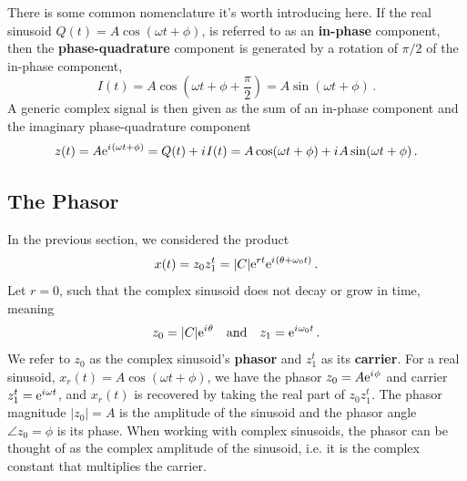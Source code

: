 There is some common nomenclature it's worth introducing here. If the real
sinusoid $Q(t) = A\cos(\omega t + \phi)$, is referred to as an \textbf{in-phase}
component, then the \textbf{phase-quadrature} component is generated by
a rotation of $\pi/2$ of the in-phase component,
%
\begin{displaymath}
  I(t) = A\cos\left(\omega t + \phi + \frac{\pi}{2}\right) = A\sin(\omega t + \phi) \,.
\end{displaymath}
%
A generic complex signal is then given as the sum of an in-phase component
and the imaginary phase-quadrature component
%
\begin{displaymath}
  z(t) = A\mathrm{e}^{{i\mkern1mu}(\omega t + \phi)} = Q(t) + {i\mkern1mu} I(t)
  = A\cos(\omega t + \phi) + {i\mkern1mu} A\sin(\omega t + \phi) \,.
\end{displaymath} 

\subsection{The Phasor}
%
In the previous section, we considered the product
%
\begin{displaymath}
  x(t) = z_0z_1^t = |C|\mathrm{e}^{rt}\mathrm{e}^{{i\mkern1mu}(\theta + \omega_0 t)} \,.
\end{displaymath}
%
Let $r=0$, such that the complex sinusoid does not decay or grow in time, meaning
%
\begin{displaymath}
  z_0 = |C|\mathrm{e}^{{i\mkern1mu}\theta} \quad\mathrm{and}\quad z_1 = \mathrm{e}^{{i\mkern1mu}\omega_0 t} \,.
\end{displaymath}
%
We refer to $z_0$ as the complex sinusoid's \textbf{phasor} and $z_1^t$ as
its \textbf{carrier}. For a real sinusoid, $x_r(t) = A\cos(\omega t + \phi)$,
we have the phasor $z_0 = A\mathrm{e}^{{i\mkern1mu}\phi}$ and carrier $z_1^t = \mathrm{e}^{{i\mkern1mu}\omega t}$,
and $x_r(t)$ is recovered by taking the real part of $z_0z_1^t$. The phasor
magnitude $|z_0| = A$ is the amplitude of the sinusoid and the phasor angle
$\angle z_0 = \phi$ is its phase. When working with complex sinusoids, the
phasor can be thought of as the complex amplitude of the sinusoid, i.e.
it is the complex constant that multiplies the carrier.

